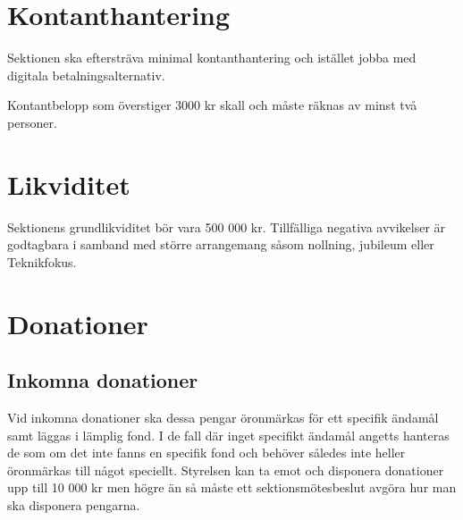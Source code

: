 \documentclass{dsekprotokoll}
\begin{document}
\begin{center}
\end{center}

\section{Kontanthantering}
Sektionen ska eftersträva minimal kontanthantering och istället jobba med
digitala betalningsalternativ.

Kontantbelopp som överstiger 3000 kr skall och måste räknas av minst två
personer.

\section{Likviditet}
Sektionens grundlikviditet bör vara 500 000 kr. Tillfälliga negativa avvikelser
är godtagbara i samband med större arrangemang såsom nollning, jubileum eller
Teknikfokus.

\section{Donationer}

\subsection{Inkomna donationer}
Vid inkomna donationer ska dessa pengar öronmärkas för ett specifik ändamål samt
läggas i lämplig fond. I de fall där inget specifikt ändamål angetts hanteras de
som om det inte fanns en specifik fond och behöver således inte heller
öronmärkas till något speciellt.  Styrelsen kan ta emot och disponera donationer
upp till 10 000 kr men högre än så måste ett sektionsmötesbeslut avgöra hur man
ska disponera pengarna.
\end{document}
